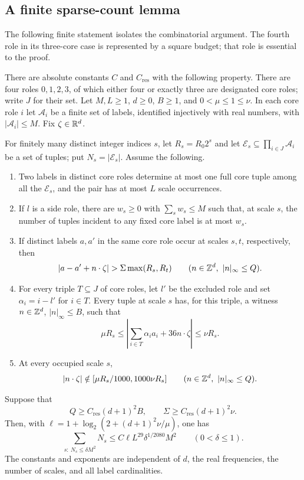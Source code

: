 \subsection{A finite sparse-count lemma}

The following finite statement isolates the combinatorial argument.
The fourth role in its three-core case is represented by a square
budget; that role is essential to the proof.

\begin{lemma}
\label{lem:finite-sparse-count}
There are absolute constants $C$ and $C_{\mathrm{res}}$ with the
following property.  There are four roles $0,1,2,3$, of which either
four or exactly three are designated core roles; write $J$ for their
set.  Let $M,L\geq1$, $d\geq0$, $B\geq1$, and
$0<\mu\leq1\leq\nu$.  In each core role $i$ let $\mathcal A_i$ be
a finite set of labels, identified injectively with real numbers,
with $|\mathcal A_i|\leq M$.  Fix $\zeta\in\mathbb R^d$.

For finitely many distinct integer indices $s$, let
$R_s=R_0 2^s$ and let $\mathcal E_s\subseteq\prod_{i\in J}\mathcal A_i$
be a set of tuples; put $N_s=|\mathcal E_s|$.  Assume the following.
\begin{enumerate}
\item Two labels in distinct core roles determine at most one full
core tuple among all the $\mathcal E_s$, and the pair has at most
$L$ scale occurrences.
\item If $l$ is a side role, there are $w_s\geq0$ with
$\sum_s w_s\leq M$ such that, at scale $s$, the number of tuples
incident to any fixed core label is at most $w_s$.
\item If distinct labels $a,a'$ in the same core role occur at scales
$s,t$, respectively, then
\[
 |a-a'+n\cdot\zeta|>\Sigma\max(R_s,R_t)
 \qquad(n\in\Z^d,\ |n|_\infty\leq Q).
\]
\item For every triple $T\subseteq J$ of core roles, let $l'$ be the
excluded role and set $\alpha_i=i-l'$ for $i\in T$.  Every tuple at
scale $s$ has, for this triple, a witness $n\in\mathbb Z^d$, $|n|_\infty\leq B$,
such that
\[
 \mu R_s\leq
 \left|\sum_{i\in T}\alpha_i a_i+36n\cdot\zeta\right|
 \leq\nu R_s.
\]
\item At every occupied scale $s$,
\[
 |n\cdot\zeta|\notin
 [\mu R_s/1000,1000\nu R_s]
 \qquad(n\in\mathbb Z^d,\ |n|_\infty\leq Q).
\]
\end{enumerate}
Suppose that
\[
 Q\geq C_{\mathrm{res}}(d+1)^2B,
 \qquad \Sigma\geq C_{\mathrm{res}}(d+1)^2\nu.
\]
Then, with $\ell=1+\log_2(2+(d+1)^2\nu/\mu)$, one has
\[
 \sum_{s:\ N_s\leq\delta M^2}N_s
 \leq C\ell L^{29}\delta^{1/2080}M^2
 \qquad(0<\delta\leq1).
\]
The constants and exponents are independent of $d$, the real
frequencies, the number of scales, and all label cardinalities.
\end{lemma}

